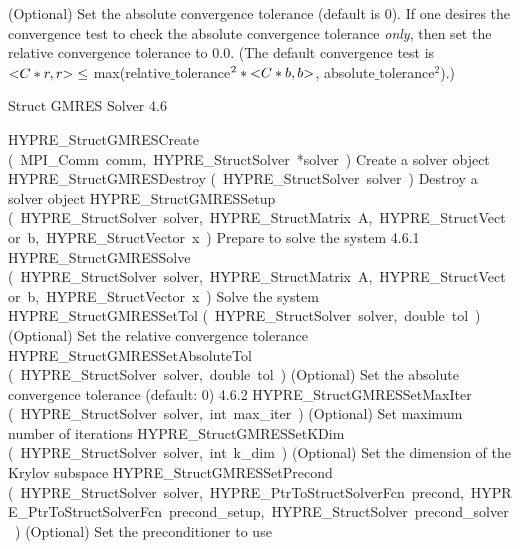 \documentclass{article}
\begin{document}
\begin{cxxentry}
\begin{cxxentry}
\begin{cxxfunction}
\begin{cxxdoc}
(Optional) Set the absolute convergence tolerance (default is
0). If one desires the convergence test to check the absolute
convergence tolerance {\it only}, then set the relative convergence
tolerance to 0.0.  (The default convergence test is $ {\tt <}C*r,r{\tt >} \leq$
max(relative$\_$tolerance$^{2} \ast {\tt <}C*b, b{\tt >}$, absolute$\_$tolerance$^2$).)
\end{cxxdoc}
\end{cxxfunction}
\end{cxxentry}
\begin{cxxentry}
{}
        {Struct GMRES Solver}
        {}
        {
}
        {4.6}
\begin{cxxnames}
        {HYPRE\_StructGMRESCreate}
        {(\ MPI\_Comm\ comm,\ HYPRE\_StructSolver\ *solver\ )}
        {
Create a solver object}
        {}
\label{cxx.4.6.3}
        {HYPRE\_StructGMRESDestroy}
        {(\ HYPRE\_StructSolver\ solver\ )}
        {
Destroy a solver object}
        {}
\label{cxx.4.6.4}
        {HYPRE\_StructGMRESSetup}
        {(\ HYPRE\_StructSolver\ solver,\ HYPRE\_StructMatrix\ A,\ HYPRE\_StructVector\ b,\ HYPRE\_StructVector\ x\ )}
        {
Prepare to solve the system}
        {4.6.1}
        {HYPRE\_StructGMRESSolve}
        {(\ HYPRE\_StructSolver\ solver,\ HYPRE\_StructMatrix\ A,\ HYPRE\_StructVector\ b,\ HYPRE\_StructVector\ x\ )}
        {
Solve the system}
        {}
\label{cxx.4.6.5}
        {HYPRE\_StructGMRESSetTol}
        {(\ HYPRE\_StructSolver\ solver,\ double\ tol\ )}
        {
(Optional) Set the relative convergence tolerance}
        {}
\label{cxx.4.6.6}
        {HYPRE\_StructGMRESSetAbsoluteTol}
        {(\ HYPRE\_StructSolver\ solver,\ double\ tol\ )}
        {
(Optional) Set the absolute convergence tolerance  (default: 0)}
        {4.6.2}
        {HYPRE\_StructGMRESSetMaxIter}
        {(\ HYPRE\_StructSolver\ solver,\ int\ max\_iter\ )}
        {
(Optional) Set maximum number of iterations}
        {}
\label{cxx.4.6.7}
        {HYPRE\_StructGMRESSetKDim}
        {(\ HYPRE\_StructSolver\ solver,\ int\ k\_dim\ )}
        {
(Optional) Set the dimension of the Krylov subspace}
        {}
\label{cxx.4.6.8}
        {HYPRE\_StructGMRESSetPrecond}
        {(\ HYPRE\_StructSolver\ solver,\ HYPRE\_PtrToStructSolverFcn\ precond,\ HYPRE\_PtrToStructSolverFcn\ precond\_setup,\ HYPRE\_StructSolver\ precond\_solver\ )}
        {
(Optional) Set the preconditioner to use}
        {}
\label{cxx.4.6.9}

\end{cxxnames}
\end{cxxentry}
\end{cxxentry}
\end{document}
